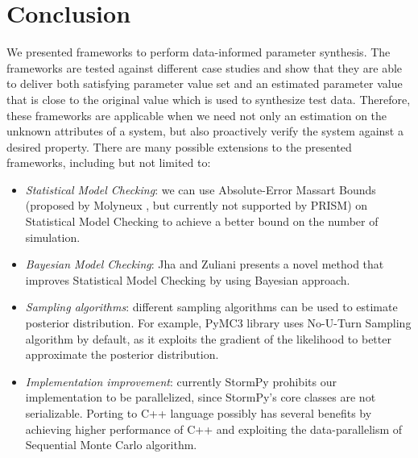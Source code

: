 \chapter{Conclusion}
We presented frameworks to perform data-informed parameter synthesis. The frameworks are tested
against different case studies and show that they are able to deliver both satisfying parameter
value set and an estimated parameter value that is close to the original value which is used to
synthesize test data. Therefore, these frameworks are applicable when we need not only an estimation
on the unknown attributes of a system, but also proactively verify the system against a desired property.
There are many possible extensions to the presented frameworks, including but not limited to:
\begin{itemize}
      \item \textit{Statistical Model Checking}: we can use Absolute-Error Massart Bounds (proposed by
            Molyneux \cite{molyneux2020abc}, but currently not supported by PRISM) on Statistical
            Model Checking to achieve a better bound on the number of simulation.
      \item \textit{Bayesian Model Checking}: Jha \cite{jha2009bayesian} and Zuliani
            \cite{zuliani2013bayesian} presents a novel method that improves Statistical Model
            Checking by using Bayesian approach.
      \item \textit{Sampling algorithms}: different sampling algorithms can be used to estimate
            posterior distribution. For example, PyMC3 library \cite{salvatier2016pymc3} uses
            No-U-Turn Sampling algorithm by default, as it exploits the gradient of the likelihood
            to better approximate the posterior distribution.
      \item \textit{Implementation improvement}: currently StormPy prohibits our implementation to be
            parallelized, since StormPy's core classes are not serializable. Porting to C++ language
            possibly has several benefits by achieving higher performance of C++ and exploiting the
            data-parallelism of Sequential Monte Carlo algorithm.
\end{itemize}